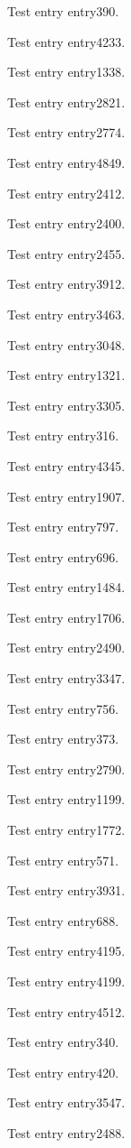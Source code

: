Test entry \gls{entry390}.

Test entry \gls{entry4233}.

Test entry \gls{entry1338}.

Test entry \gls{entry2821}.

Test entry \gls{entry2774}.

Test entry \gls{entry4849}.

Test entry \gls{entry2412}.

Test entry \gls{entry2400}.

Test entry \gls{entry2455}.

Test entry \gls{entry3912}.

Test entry \gls{entry3463}.

Test entry \gls{entry3048}.

Test entry \gls{entry1321}.

Test entry \gls{entry3305}.

Test entry \gls{entry316}.

Test entry \gls{entry4345}.

Test entry \gls{entry1907}.

Test entry \gls{entry797}.

Test entry \gls{entry696}.

Test entry \gls{entry1484}.

Test entry \gls{entry1706}.

Test entry \gls{entry2490}.

Test entry \gls{entry3347}.

Test entry \gls{entry756}.

Test entry \gls{entry373}.

Test entry \gls{entry2790}.

Test entry \gls{entry1199}.

Test entry \gls{entry1772}.

Test entry \gls{entry571}.

Test entry \gls{entry3931}.

Test entry \gls{entry688}.

Test entry \gls{entry4195}.

Test entry \gls{entry4199}.

Test entry \gls{entry4512}.

Test entry \gls{entry340}.

Test entry \gls{entry420}.

Test entry \gls{entry3547}.

Test entry \gls{entry2488}.

